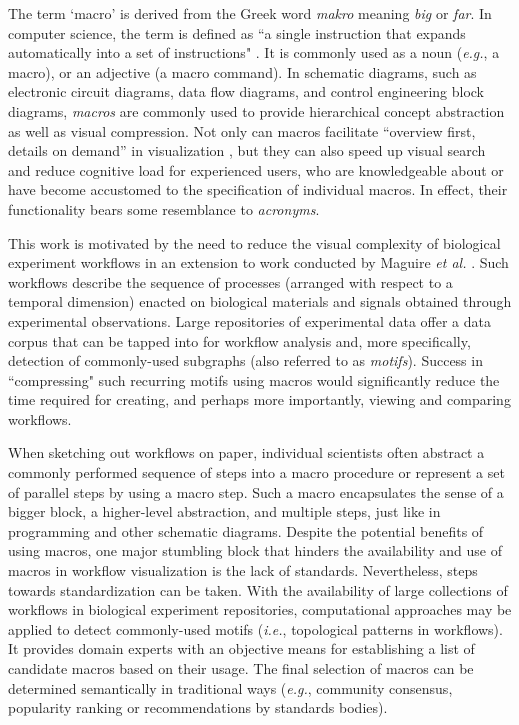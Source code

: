 The term `macro' is derived from the Greek word \emph{makro} meaning \emph{big} or \emph{far}.
In computer science, the term is defined as ``a single instruction that expands automatically into a set of instructions" \cite{oxforddict}.
It is commonly used as a noun (\emph{e.g.}, a macro), or an adjective (a macro command). 
In schematic diagrams, such as electronic circuit diagrams, data flow diagrams, and control engineering block diagrams, \emph{macros} are commonly used to provide hierarchical concept abstraction as well as visual compression.
Not only can macros facilitate ``overview first, details on demand'' in visualization \cite{shneiderman96}, but they can also speed up visual search and reduce cognitive load for experienced users, who are knowledgeable about or have become accustomed to the specification of individual macros.
In effect, their functionality bears some resemblance to \emph{acronyms}.

This work is motivated by the need to reduce the visual complexity of biological experiment workflows in an extension to work conducted by Maguire \emph{et al.} \cite{Maguire:2012:TVCG}. Such workflows describe the sequence of processes (arranged with respect to a temporal dimension) enacted on biological materials and signals obtained through experimental observations. Large repositories of experimental data offer a data corpus that can be tapped into for workflow analysis and, more specifically, detection of commonly-used subgraphs (also referred to as \emph{motifs}).
Success in ``compressing" such recurring motifs using macros would significantly reduce the time required for creating, and perhaps more importantly, viewing and comparing workflows.

When sketching out workflows on paper, individual scientists often abstract a commonly performed sequence of steps into a macro procedure or represent a set of parallel steps by using a macro step.
Such a macro encapsulates the sense of a bigger block, a higher-level abstraction, and multiple steps, just like in programming and other schematic diagrams.
Despite the potential benefits of using macros, one major stumbling block that hinders the availability and use of macros in workflow visualization is the lack of standards.
Nevertheless, steps towards standardization can be taken.
With the availability of large collections of workflows in biological experiment repositories, computational approaches may be applied to detect commonly-used motifs (\emph{i.e.}, topological patterns in workflows).
It provides domain experts with an objective means for establishing a list of candidate macros based on their usage.
The final selection of macros can be determined semantically in traditional ways (\emph{e.g.}, community consensus, popularity ranking or recommendations by standards bodies).

